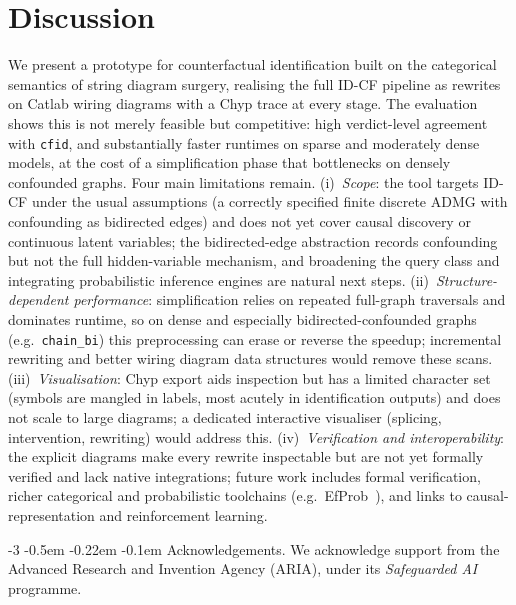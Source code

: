 \documentclass[runningheads]{llncs}
\makeatletter
\renewcommand\paragraph{\@startsection{paragraph}{4}{\z@}%
                       {-3\p@ \@plus -2\p@ \@minus -2\p@}%
                       {-0.5em \@plus -0.22em \@minus -0.1em}%
                       {\normalfont\normalsize\bfseries}}
\makeatother
\begin{document}
\section{Discussion}\label{sec:discussion}

We present a prototype for counterfactual identification built on the categorical semantics of string diagram surgery, realising the full ID-CF pipeline as rewrites on Catlab wiring diagrams with a Chyp trace at every stage. The evaluation shows this is not merely feasible but competitive: high verdict-level agreement with \texttt{cfid}, and substantially faster runtimes on sparse and moderately dense models, at the cost of a simplification phase that bottlenecks on densely confounded graphs.
Four main limitations remain. (i)~\emph{Scope}: the tool targets ID-CF under the usual assumptions (a correctly specified finite discrete ADMG with confounding as bidirected edges) and does not yet cover causal discovery or continuous latent variables; the bidirected-edge abstraction records confounding but not the full hidden-variable mechanism, and broadening the query class and integrating probabilistic inference engines are natural next steps. (ii)~\emph{Structure-dependent performance}: simplification relies on repeated full-graph traversals and dominates runtime, so on dense and especially bidirected-confounded graphs (e.g.\ \texttt{chain\_bi}) this preprocessing can erase or reverse the speedup; incremental rewriting and better wiring diagram data structures would remove these scans. (iii)~\emph{Visualisation}: Chyp export aids inspection but has a limited character set (symbols are mangled in labels, most acutely in identification outputs) and does not scale to large diagrams; a dedicated interactive visualiser (splicing, intervention, rewriting) would address this. (iv)~\emph{Verification and interoperability}: the explicit diagrams make every rewrite inspectable but are not yet formally verified and lack native integrations; future work includes formal verification, richer categorical and probabilistic toolchains (e.g.\ EfProb~\cite{cho2017efprob}), and links to causal-representation and reinforcement learning.


\paragraph{Acknowledgements.}
We acknowledge support from the Advanced Research and Invention Agency (ARIA), under its \emph{Safeguarded AI} programme.



\end{document}
